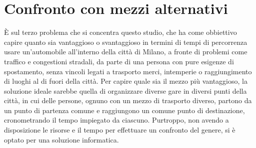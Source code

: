 \section{Confronto con mezzi alternativi}

È sul terzo problema che si concentra questo studio, che ha come obbiettivo capire quanto sia vantaggioso o svantaggioso in termini di tempi di percorrenza usare un'automobile all'interno della città di Milano, a fronte di problemi come traffico e congestioni stradali, da parte di una persona con pure esigenze di spostamento, senza vincoli legati a trasporto merci, intemperie o raggiungimento di luoghi al di fuori della città. Per capire quale sia il mezzo più vantaggioso, la soluzione ideale sarebbe quella di organizzare diverse gare in diversi punti della città, in cui delle persone, ognuno con un mezzo di trasporto diverso, partono da un punto di partenza comune e raggiungono un comune punto di destinazione, cronometrando il tempo impiegato da ciascuno. Purtroppo, non avendo a disposizione le risorse e il tempo per effettuare un confronto del genere, si è optato per una soluzione informatica.